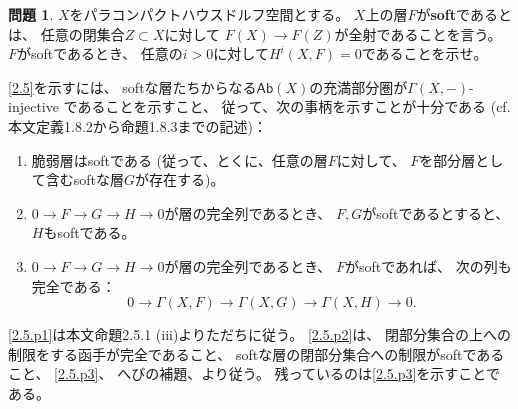 \documentclass[uplatex,dvipdfmx]{jsarticle}
\makeatletter
\theoremstyle{definition}
\newtheorem{prob}[prob]{問題}
\renewenvironment{proof}[1][\proofname]{
  \pushQED{\qed}%
  \normalfont \topsep6\p@\@plus6\p@\relax
  \trivlist
  \item[\hskip\labelsep
    #1\@addpunct{\textbf{.}}]\ignorespaces
}{%
  \popQED\endtrivlist\@endpefalse
}
\providecommand{\proofname}{証明}
\newcommand{\Ab}{\mathsf{Ab}}
\makeatother
\begin{document}
\begin{prob}\label{2.5}
  \(X\)をパラコンパクトハウスドルフ空間とする。
  \(X\)上の層\(F\)が\textbf{soft}であるとは、
  任意の閉集合\(Z\subset X\)に対して
  \(F(X)\to F(Z)\)が全射であることを言う。
  \(F\)がsoftであるとき、
  任意の\(i > 0\)に対して\(H^i(X,F)=0\)であることを示せ。
\end{prob}

\begin{proof}
  \autoref{2.5}を示すには、
  softな層たちからなる\(\Ab(X)\)の充満部分圏が\(\Gamma(X,-)\)-injective
  であることを示すこと、
  従って、次の事柄を示すことが十分である
  (cf. 本文定義1.8.2から命題1.8.3までの記述)：
  \begin{enumerate}
    \item \label{2.5.p1}
    脆弱層はsoftである
    (従って、とくに、任意の層\(F\)に対して、
    \(F\)を部分層として含むsoftな層\(G\)が存在する)。
    \item \label{2.5.p2}
    \(0\to F\to G\to H\to 0\)が層の完全列であるとき、
    \(F,G\)がsoftであるとすると、\(H\)もsoftである。
    \item \label{2.5.p3}
    \(0\to F\to G\to H\to 0\)が層の完全列であるとき、
    \(F\)がsoftであれば、
    次の列も完全である：
    \[
    0\to \Gamma(X,F) \to \Gamma(X,G) \to \Gamma(X,H)\to 0.
    \]
  \end{enumerate}
  \ref{2.5.p1}は本文命題2.5.1 (iii)よりただちに従う。
  \ref{2.5.p2}は、
  閉部分集合の上への制限をする函手が完全であること、
  softな層の閉部分集合への制限がsoftであること、
  \ref{2.5.p3}、
  へびの補題、より従う。
  残っているのは\ref{2.5.p3}を示すことである。


\end{proof}
\end{document}
